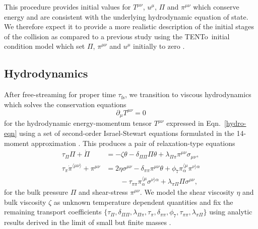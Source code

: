 \documentclass[aps,prc,reprint,amsmath,nofootinbib]{revtex4-1}
\newcommand{\trento}{T\raisebox{-0.5ex}{R}ENTo}
\newcommand{\taufs}{\tau_\text{fs}}
\begin{document}
This procedure provides initial values for $T^{\mu\nu}$, $u^\mu$, $\Pi$ and $\pi^{\mu\nu}$ which conserve energy and are consistent with the underlying hydrodynamic equation of state.
We therefore expect it to provide a more realistic description of the initial stages of the collision as compared to a previous study using the \trento\ initial condition model which set $\Pi$, $\pi^{\mu\nu}$ and $u^\mu$ initially to zero \cite{Bernhard:2016tnd}.

\subsection{Hydrodynamics}

After free-streaming for proper time $\taufs$, we transition to viscous hydrodynamics which solves the conservation equations
\begin{equation}
  \label{eq:continuity}
  \partial_\mu T^{\mu\nu} = 0
\end{equation}
for the hydrodynamic energy-momentum tensor $T^{\mu\nu}$ expressed in Eqn.~\eqref{hydro-eqn} using a set of second-order Israel-Stewart equations formulated in the 14-moment approximation
\cite{Israel:1979wp, Israel:1976aa, Denicol:2012cn, Denicol:2010xn}.
This produces a pair of relaxation-type equations
\begin{subequations}
  \label{eq:relaxation}
  \begin{align}
    \tau_\Pi \Pi + \dot{\Pi} &=
      - \zeta \theta - \delta_{\Pi\Pi} \Pi\theta
      + \lambda_{\Pi\pi} \pi^{\mu\nu} \sigma_{\mu\nu}, \\[1ex]
    \tau_\pi \dot{\pi}^{\langle \mu\nu \rangle} + \pi^{\mu\nu} &=
      2\eta\sigma^{\mu\nu} - \delta_{\pi\pi} \pi^{\mu\nu} \theta
      + \phi_7 \pi_\alpha^{\langle \mu} \pi^{\nu \rangle \alpha} \nonumber \\
      &\qquad {} - \tau_{\pi\pi} \pi_\alpha^{\langle \mu}\sigma^{\nu \rangle \alpha}
      + \lambda_{\pi\Pi} \Pi \sigma^{\mu\nu},
  \end{align}
\end{subequations}
for the bulk pressure $\Pi$ and shear-stress $\pi^{\mu\nu}$.
We model the shear viscosity $\eta$ and bulk viscosity $\zeta$ as unknown temperature dependent quantities and fix the remaining transport coefficients $\{\tau_\Pi, \delta_{\Pi\Pi}, \lambda_{\Pi\pi}, \tau_\pi, \delta_{\pi\pi}, \phi_7, \tau_{\pi\pi}, \lambda_{\pi\Pi}\}$ using analytic results derived in the limit of small but finite masses \cite{Denicol:2014vaa}.
\end{document}
